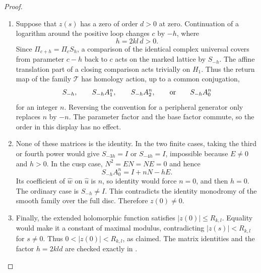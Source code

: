 \begin{proof}
\begin{enumerate}[label={$\langle1\rangle$\arabic*.},leftmargin=*]
\item Suppose that $z(s)$ has a zero of order $d>0$ at zero.
Continuation of a logarithm around the positive loop
changes $c$ by $-h$, where
\[
 h=2kl\,d>0.
\]
Since $\Pi_{c+h}=\Pi_cS_h$, a comparison of the identical
complex universal covers from parameter $c-h$ back to
$c$ acts on the marked lattice by $S_{-h}$.
The affine translation part of a closing comparison
acts trivially on $H_1$.  Thus the return map of the
family $\mathcal T$ has homology action, up to a common
conjugation,
\[
 S_{-h},\qquad S_{-h}A_1^n,\qquad
 S_{-h}A_2^n,\qquad\hbox{or}\qquad S_{-h}A_0^n
\]
for an integer $n$.  Reversing the convention for a
peripheral generator only replaces $n$ by $-n$.
The parameter factor and the base factor commute, so
the order in this display has no effect.

\item None of these matrices is the identity.  In the two
finite cases, taking the third or fourth power would
give $S_{-3h}=I$ or $S_{-4h}=I$, impossible because
$E\ne0$ and $h>0$.  In the cusp case, $N^2=EN=NE=0$
and hence
\[
 S_{-h}A_0^n=I+nN-hE.
\]
Its coefficient of $\widehat w$ on $\widehat u$ is
$n$, so identity would force $n=0$, and then $h=0$.
The ordinary case is $S_{-h}\ne I$.  This contradicts
the identity monodromy of the smooth family over
the full disc.  Therefore $z(0)\ne0$.

\item Finally, the extended holomorphic function satisfies
$|z(0)|\le R_{k,l}$.  Equality would make it a constant
of maximal modulus, contradicting $|z(s)|<R_{k,l}$
for $s\ne0$.  Thus $0<|z(0)|<R_{k,l}$, as claimed.
The matrix identities and the factor $h=2kld$ are
checked exactly in .

\end{enumerate}
\end{proof}
